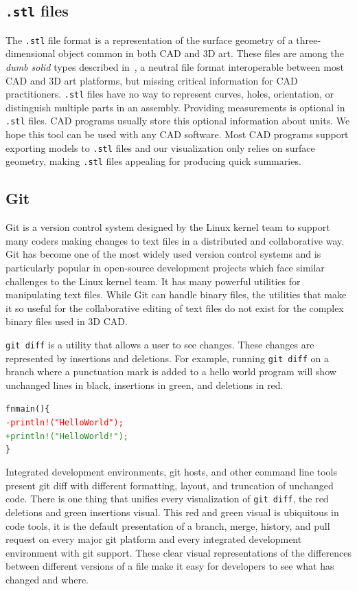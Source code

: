 \documentclass[sigconf,authorversion,nonacm]{acmart}
\begin{document}
\subsection{\texttt{.stl} files}

The \texttt{.stl} file format is a representation of the surface geometry of a three-dimensional object common in both CAD and 3D art.
These files are among the \textit{dumb solid} types described in~\cite{cheng2023age}, a neutral file format interoperable between most CAD and 3D art platforms, but missing critical information for CAD practitioners.
\texttt{.stl} files have no way to represent curves, holes, orientation, or distinguish multiple parts in an assembly.
Providing measurements is optional in \texttt{.stl} files. CAD programs usually store this optional information about units.
We hope this tool can be used with any CAD software.
Most CAD programs support exporting models to \texttt{.stl} files and our visualization only relies on surface geometry, making \texttt{.stl} files appealing for producing quick summaries.

\subsection{Git}

Git is a version control system designed by the Linux kernel team to support many coders making changes to text files in a distributed and collaborative way.
Git has become one of the most widely used version control systems and is particularly popular in open-source development projects which face similar challenges to the Linux kernel team.
It has many powerful utilities for manipulating text files.
While Git can handle binary files, the utilities that make it so useful for the collaborative editing of text files do not exist for the complex binary files used in 3D CAD.

\texttt{git diff} is a utility that allows a user to see changes.
These changes are represented by insertions and deletions.
For example, running \texttt{git diff} on a branch where a punctuation mark is added to a hello world program will show unchanged lines in black, insertions in green, and deletions in red.

\begin{alltt}
	fn main ()\{
	\textcolor{red}{   - println!("Hello World");}
	\textcolor{ForestGreen}{   + println!("Hello World!");}
	\}
\end{alltt}

Integrated development environments, git hosts, and other command line tools present git diff with different formatting, layout, and truncation of unchanged code.
There is one thing that unifies every visualization of \texttt{git diff}, the red deletions and green insertions visual.
This red and green visual is ubiquitous in code tools, it is the default presentation of a branch, merge, history, and pull request on every major git platform and every integrated development environment with git support.
These clear visual representations of the differences between different versions of a file make it easy for developers to see what has changed and where.
\end{document}
